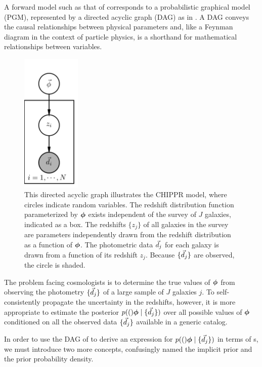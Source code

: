 A forward model such as that of  corresponds to a probabilistic graphical model (PGM), represented by a directed acyclic graph (DAG) as in .
A DAG conveys the causal relationships between physical parameters and, like a Feynman diagram in the context of particle physics, is a shorthand for mathematical relationships between variables.

\begin{figure}
	\begin{center}
		\includegraphics[width=0.25\textwidth]{figures/chippr/pgm.png}
		\caption{This directed acyclic graph illustrates the CHIPPR model, where circles indicate random variables.
			The redshift distribution function parameterized by ${\boldsymbol{\phi}}$ exists independent of the survey of $J$ galaxies, indicated as a box.  
			The redshifts $\{z_{j}\}$ of all galaxies in the survey are parameters independently drawn from the redshift distribution as a function of ${\boldsymbol{\phi}}$. 
			The photometric data $\vec{d}_{j}$ for each galaxy is drawn from a function of its redshift $z_{j}$.  
			Because $\{\vec{d}_{j}\}$ are observed, the circle is shaded.}
	\end{center}
\end{figure}

The problem facing cosmologists is to determine the true values of ${\boldsymbol{\phi}}$ from observing the photometry $\{\vec{d}_{j}\}$ of a large sample of $J$ galaxies $j$.
To self-consistently propagate the uncertainty in the redshifts, however, it is more appropriate to estimate the posterior $p((){\boldsymbol{\phi}} \mid \{\vec{d}_{j}\})$ over all possible values of ${\boldsymbol{\phi}}$ conditioned on all the observed data $\{\vec{d}_{j}\}$ available in a generic catalog.

In order to use the DAG of  to derive an expression for $p((){\boldsymbol{\phi}} \mid \{\vec{d}_{j}\})$ in terms of \pzpdf s, we must introduce two more concepts, confusingly named the implicit prior and the prior probability density.

